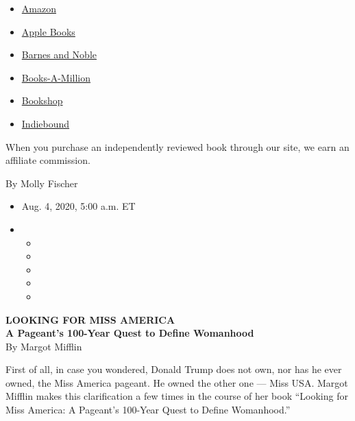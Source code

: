 \begin{itemize}
\tightlist
\item
  \href{https://www.amazon.com/gp/search?index=books\&tag=NYTBSREV-20\&field-keywords=Looking+for+Miss+America\%3A+A+Pageant\%27s+100-Year+Quest+to+Define+Womanhood+Margot+Mifflin}{Amazon}
\item
  \href{https://du-gae-books-dot-nyt-du-prd.appspot.com/buy?title=Looking+for+Miss+America\%3A+A+Pageant\%27s+100-Year+Quest+to+Define+Womanhood\&author=Margot+Mifflin}{Apple
  Books}
\item
  \href{https://www.anrdoezrs.net/click-7990613-11819508?url=https\%3A\%2F\%2Fwww.barnesandnoble.com\%2Fw\%2F\%3Fean\%3D9781640092235}{Barnes
  and Noble}
\item
  \href{https://www.anrdoezrs.net/click-7990613-35140?url=https\%3A\%2F\%2Fwww.booksamillion.com\%2Fp\%2FLooking\%2Bfor\%2BMiss\%2BAmerica\%253A\%2BA\%2BPageant\%2527s\%2B100-Year\%2BQuest\%2Bto\%2BDefine\%2BWomanhood\%2FMargot\%2BMifflin\%2F9781640092235}{Books-A-Million}
\item
  \href{https://bookshop.org/a/3546/9781640092235}{Bookshop}
\item
  \href{https://www.indiebound.org/book/9781640092235?aff=NYT}{Indiebound}
\end{itemize}

When you purchase an independently reviewed book through our site, we
earn an affiliate commission.

By Molly Fischer

\begin{itemize}
\item
  Aug. 4, 2020, 5:00 a.m. ET
\item
  \begin{itemize}
  \item
  \item
  \item
  \item
  \item
  \end{itemize}
\end{itemize}

\textbf{LOOKING FOR MISS AMERICA}\\
\textbf{A Pageant's 100-Year Quest to Define Womanhood}\\
By Margot Mifflin

First of all, in case you wondered, Donald Trump does not own, nor has
he ever owned, the Miss America pageant. He owned the other one --- Miss
USA. Margot Mifflin makes this clarification a few times in the course
of her book ``Looking for Miss America: A Pageant's 100-Year Quest to
Define Womanhood.''

